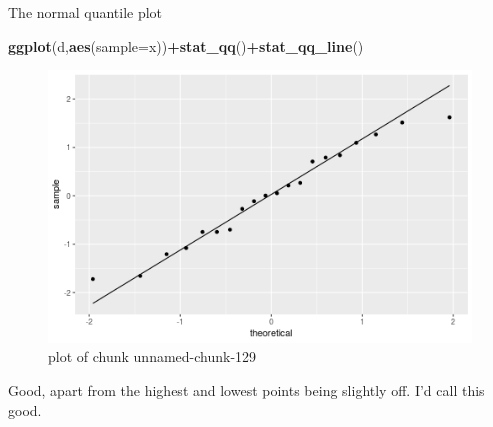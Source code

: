 \documentclass[ignorenonframetext,]{beamer}
\newenvironment{Shaded}{\begin{snugshade}}{\end{snugshade}}
\newcommand{\DataTypeTok}[1]{\textcolor[rgb]{0.13,0.29,0.53}{#1}}
\newcommand{\KeywordTok}[1]{\textcolor[rgb]{0.13,0.29,0.53}{\textbf{#1}}}
\newcommand{\NormalTok}[1]{#1}
\newcommand{\OperatorTok}[1]{\textcolor[rgb]{0.81,0.36,0.00}{\textbf{#1}}}
\begin{document}
\begin{frame}[fragile]{The normal quantile plot}
\protect\hypertarget{the-normal-quantile-plot-2}{}

\begin{Shaded}
\begin{Highlighting}[]
\KeywordTok{ggplot}\NormalTok{(d,}\KeywordTok{aes}\NormalTok{(}\DataTypeTok{sample=}\NormalTok{x))}\OperatorTok{+}\KeywordTok{stat_qq}\NormalTok{()}\OperatorTok{+}\KeywordTok{stat_qq_line}\NormalTok{()}
\end{Highlighting}
\end{Shaded}

\begin{figure}
\centering
\includegraphics{figure/unnamed-chunk-129-1.png}
\caption{plot of chunk unnamed-chunk-129}
\end{figure}

Good, apart from the highest and lowest points being slightly off. I'd
call this good.

\end{frame}
\end{document}
